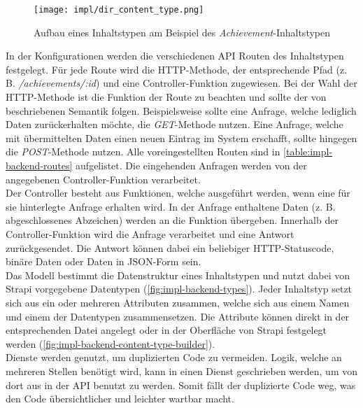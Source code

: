 \begin{figure}[htpb]
    \centering
    \texttt{[image: impl/dir\_content\_type.png]}
    \caption{Aufbau eines Inhaltstypen am Beispiel des \textit{Achievement}-Inhaltstypen}
    \label{fig:impl-backend-content-type}
\end{figure}

In der Konfigurationen werden die verschiedenen API Routen des Inhaltstypen
festgelegt. Für jede Route wird die HTTP-Methode, der entsprechende Pfad (z. B.
\textit{/achievements/:id}) und eine Controller-Funktion zugewiesen. Bei der
Wahl der HTTP-Methode ist die Funktion der Route zu beachten und sollte der von
\textcite{RFC7231} beschriebenen Semantik folgen. Beispielsweise sollte eine
Anfrage, welche lediglich Daten zurückerhalten möchte, die \textit{GET}-Methode
nutzen. Eine Anfrage, welche mit übermittelten Daten einen neuen Eintrag im
System erschafft, sollte hingegen die \textit{POST}-Methode nutzen. Alle
voreingestellten Routen sind in \autoref{table:impl-backend-routes} aufgelistet.
Die eingehenden Anfragen werden von der angegebenen Controller-Funktion
verarbeitet. \\
Der Controller besteht aus Funktionen, welche ausgeführt werden, wenn eine für
sie hinterlegte Anfrage erhalten wird. In der Anfrage enthaltene Daten (z. B.
abgeschlossenes Abzeichen) werden an die Funktion übergeben. Innerhalb der
Controller-Funktion wird die Anfrage verarbeitet und eine Antwort
zurückgesendet. Die Antwort können dabei ein beliebiger HTTP-Statuscode, binäre
Daten oder Daten in JSON-Form sein. \\
Das Modell bestimmt die Datenstruktur eines Inhaltstypen und nutzt dabei von
Strapi vorgegebene Datentypen (\autoref{fig:impl-backend-types}). Jeder
Inhaltstyp setzt sich aus ein oder mehreren Attributen zusammen, welche sich aus
einem Namen und einem der Datentypen zusammensetzen. Die Attribute können direkt
in der entsprechenden Datei angelegt oder in der Oberfläche von Strapi
festgelegt werden (\autoref{fig:impl-backend-content-type-builder}).
\\
Dienste werden genutzt, um duplizierten Code zu vermeiden. Logik, welche an
mehreren Stellen benötigt wird, kann in einen Dienst geschrieben werden, um von
dort aus in der API benutzt zu werden. Somit fällt der duplizierte Code weg, was
den Code übersichtlicher und leichter wartbar macht.

